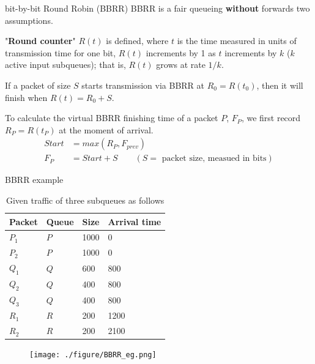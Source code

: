 \documentclass[10pt]{beamer}
\begin{document}
\begin{frame}{bit-by-bit Round Robin (BBRR)}
BBRR is a fair queueing \textbf{without} forwards two assumptions.

"\textbf{Round counter}" $R(t)$ is defined, where $t$ is the time measured in units of transmission time for one bit, $R(t)$ increments by 1 as $t$ increments by $k$ ($k$ active input subqueues); that is, $R(t)$ grows at rate $1/k$.

If a packet of size $S$ starts transmission via BBRR at $R_0 = R(t_0)$, then it will finish when $R(t) = R_0 + S$.

To calculate the virtual BBRR finishing time of a packet $P$, $F_P$, we first record $R_P = R(t_P)$ at the moment of arrival.
\begin{align}
Start &= max(R_P, F_{prev}) \nonumber\\
F_P 	  &= Start + S \qquad (S= \text{ packet size, measued in bits})
\end{align}
\end{frame}

\begin{frame}{BBRR example}
\begin{table}
\caption{Given traffic of three subqueues as follows}
\begin{tabular}{llll}
\toprule
Packet & Queue & Size & Arrival time\\
\midrule
$P_1$  & $P$   & 1000 & 0 \\
$P_2$  & $P$   & 1000 & 0 \\
$Q_1$  & $Q$   & 600  & 800 \\
$Q_2$  & $Q$   & 400  & 800 \\
$Q_3$  & $Q$   & 400 & 800 \\
$R_1$  & $R$   & 200 & 1200 \\
$R_2$  & $R$   & 200 & 2100 \\
\bottomrule
\end{tabular}
\end{table}
\begin{figure}
\texttt{[image: ./figure/BBRR\_eg.png]}
\end{figure}
\end{frame}
\end{document}
